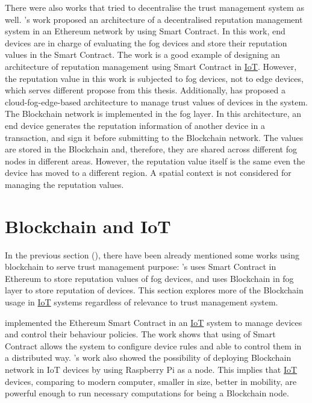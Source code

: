\npara There were also works that tried to decentralise the trust management system as well.
\cite{PublicFogReputationEthereum}'s work proposed an architecture of a decentralised reputation management system in an Ethereum network by using Smart Contract.
In this work, end devices are in charge of evaluating the fog devices and store their reputation values in the Smart Contract.
The work is a good example of designing an architecture of reputation management using Smart Contract in \hyperref[Acronym-IoT]{IoT}.
However, the reputation value in this work is subjected to fog devices, not to edge devices, which serves different propose from this thesis.
Additionally, \cite{IoETrustBlockchain} has proposed a cloud-fog-edge-based architecture to manage trust values of devices in the system.
The Blockchain network is implemented in the fog layer.
In this architecture, an end device generates the reputation information of another device in a transaction, and sign it before submitting to the Blockchain network.
The values are stored in the Blockchain and, therefore, they are shared across different fog nodes in different areas.
However, the reputation value itself is the same even the device has moved to a different region.
A spatial context is not considered for managing the reputation values.

\section{Blockchain and IoT} \label{RelatedWorks-BlockchainIoT}

\npara In the previous section (\textit{}), there have been already mentioned some works using blockchain to serve trust management purpose:
  \cite{PublicFogReputationEthereum}'s uses Smart Contract in Ethereum to store reputation values of fog devices,
  and \cite{IoETrustBlockchain} uses Blockchain in fog layer to store reputation of devices.
This section explores more of the Blockchain usage in \hyperref[Acronym-IoT]{IoT} systems regardless of relevance to trust management system.

\npara \cite{ManageIoTBlockchain} implemented the Ethereum Smart Contract in an \hyperref[Acronym-IoT]{IoT} system to manage devices and control their behaviour policies.
The work shows that using of Smart Contract allows the system to configure device rules and able to control them in a distributed way.
\cite{RaspberryPiEthereum}'s work also showed the possibility of deploying Blockchain network in IoT devices by using Raspberry Pi as a node.
This implies that \hyperref[Acronym-IoT]{IoT} devices, comparing to modern computer, smaller in size, better in mobility, are powerful enough to run necessary computations for being a Blockchain node.

